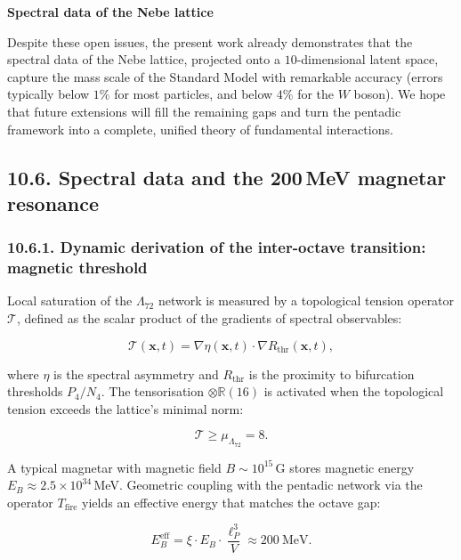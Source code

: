 \documentclass[11pt]{article}
\let\oldmathcal\mathcal
\renewcommand{\mathcal}[1]{\oldmathcal{#1}}
\begin{document}
\textbf{Spectral data of the Nebe lattice}

Despite these open issues, the present work already demonstrates that
the spectral data of the Nebe lattice, projected onto a
\(10\)-dimensional latent space, capture the mass scale of the Standard
Model with remarkable accuracy (errors typically below \(1\%\) for most
particles, and below \(4\%\) for the \(W\) boson). We hope that future
extensions will fill the remaining gaps and turn the pentadic framework
into a complete, unified theory of fundamental interactions.

\hypertarget{spectral-data-and-the-200-mev-magnetar-resonance}{%
\subsection{10.6. Spectral data and the 200\,MeV magnetar
resonance}\label{spectral-data-and-the-200-mev-magnetar-resonance}}

\hypertarget{dynamic-derivation-of-the-inter-octave-transition-magnetic-threshold}{%
\subsubsection{10.6.1. Dynamic derivation of the inter-octave
transition: magnetic
threshold}\label{dynamic-derivation-of-the-inter-octave-transition-magnetic-threshold}}

Local saturation of the \(\Lambda_{72}\) network is measured by a
topological tension operator \(\mathcal{T}\), defined as the scalar
product of the gradients of spectral observables:

\[
\mathcal{T}(\mathbf{x}, t) = \nabla \eta(\mathbf{x}, t) \cdot \nabla R_{\text{thr}}(\mathbf{x}, t),
\]

where \(\eta\) is the spectral asymmetry and \(R_{\text{thr}}\) is the
proximity to bifurcation thresholds \(P_4/N_4\). The tensorisation
\(\otimes \mathbb{R}(16)\) is activated when the topological tension
exceeds the lattice's minimal norm:

\[
\mathcal{T} \ge \mu_{\Lambda_{72}} = 8.
\]

A typical magnetar with magnetic field \(B \sim 10^{15}\)\,G stores
magnetic energy \(E_B \approx 2.5 \times 10^{34}\)\,MeV. Geometric
coupling with the pentadic network via the operator \(T_{\text{fire}}\)
yields an effective energy that matches the octave gap:

\[
E_B^{\text{eff}} = \xi \cdot E_B \cdot \frac{\ell_P^3}{V} \approx 200\ \text{MeV}.
\]
\end{document}
